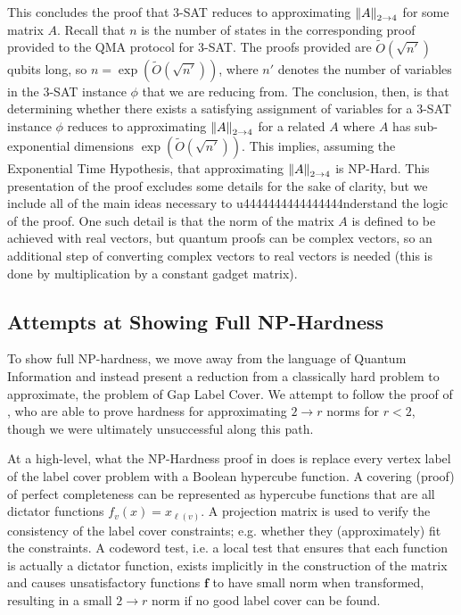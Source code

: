 \documentclass[10pt]{article}
\newcommand{\ATF}{\norm{A}_{2 \to 4}}
\begin{document}
This concludes the proof that 3-SAT reduces to approximating $\ATF$ for some matrix $A$. Recall that $n$ is the number of states in the corresponding proof provided to the QMA protocol for 3-SAT. The proofs provided are $\tilde{O}(\sqrt{n'})$ qubits long, so $n = \exp(\tilde{O}(\sqrt{n'}))$, where $n'$ denotes the number of variables in the 3-SAT instance $\phi$ that we are reducing from. The conclusion, then, is that determining whether there exists a satisfying assignment of variables for a 3-SAT instance $\phi$ reduces to approximating $\ATF$ for a related $A$ where $A$ has sub-exponential dimensions $\exp(\tilde{O}(\sqrt{n'}))$. This implies, assuming the Exponential Time Hypothesis, that approximating $\ATF$ is NP-Hard. This presentation of the proof excludes some details for the sake of clarity, but we include all of the main ideas necessary to u4444444444444444nderstand the logic of the proof. One such detail is that the norm of the matrix $A$ is defined to be achieved with real vectors, but quantum proofs can be complex vectors, so an additional step of converting complex vectors to real vectors is needed (this is done by multiplication by a constant gadget matrix).


\subsection{Attempts at Showing Full NP-Hardness}
To show full NP-hardness, we move away from the language of Quantum Information and instead present a reduction from a classically hard problem to approximate, the problem of Gap Label Cover. We attempt to follow the proof of \cite{pqalmost}, who are able to prove hardness for approximating $2 \to r$ norms for $r < 2$, though we were ultimately unsuccessful along this path.

At a high-level, what the NP-Hardness proof in \cite{pqalmost} does is replace every vertex label of the label cover problem with a Boolean hypercube function. A covering (proof) of perfect completeness can be represented as hypercube functions that are all dictator functions $f_v(x) = x_{\ell(v)}$. A projection matrix is used to verify the consistency of the label cover constraints; e.g. whether they (approximately) fit the constraints. A codeword test, i.e. a local test that ensures that each function is actually a dictator function, exists implicitly in the construction of the matrix and causes unsatisfactory functions $\mathbf{f}$ to have small norm when transformed, resulting in a small $2 \to r$ norm if no good label cover can be found.
\end{document}
